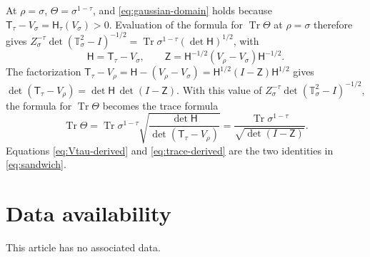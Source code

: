 \documentclass[11pt]{amsart}
\numberwithin{equation}{section}
\theoremstyle{definition}
\newcommand{\Therm}{\mathsf H}
\newcommand{\Tr}{\operatorname{Tr}}
\begin{document}
At \(\rho=\sigma\), \(\Theta=\sigma^{1-\tau}\), and
\eqref{eq:gaussian-domain} holds because
\(\mathsf T_\tau-V_\sigma=\Therm_\tau(V_\sigma)>0\). Evaluation of the
formula for \(\Tr\Theta\) at \(\rho=\sigma\) therefore gives
\(Z_\sigma^{-\tau}\det(\mathbb T_\sigma^2-I)^{-1/2}
=\Tr\sigma^{1-\tau}(\det\mathsf H)^{1/2}\), with
\[
 \mathsf H=\mathsf T_\tau-V_\sigma,\qquad
 \mathsf Z=
 \mathsf H^{-1/2}(V_\rho-V_\sigma)\mathsf H^{-1/2}.
\]
The factorization
\(\mathsf T_\tau-V_\rho=\mathsf H-(V_\rho-V_\sigma)
=\mathsf H^{1/2}(I-\mathsf Z)\mathsf H^{1/2}\) gives
\(\det(\mathsf T_\tau-V_\rho)=\det\mathsf H\,\det(I-\mathsf Z)\). With
this value of \(Z_\sigma^{-\tau}\det(\mathbb T_\sigma^2-I)^{-1/2}\), the
formula for \(\Tr\Theta\) becomes the trace formula
\begin{equation}
 \Tr\Theta
 =\Tr\sigma^{1-\tau}
  \sqrt{\frac{\det\mathsf H}{\det(\mathsf T_\tau-V_\rho)}}
 =\frac{\Tr\sigma^{1-\tau}}{\sqrt{\det(I-\mathsf Z)}}.
 \label{eq:trace-derived}
\end{equation}
Equations \eqref{eq:Vtau-derived} and \eqref{eq:trace-derived} are
the two identities in \eqref{eq:sandwich}.

\section*{Data availability}

This article has no associated data.



\end{document}
